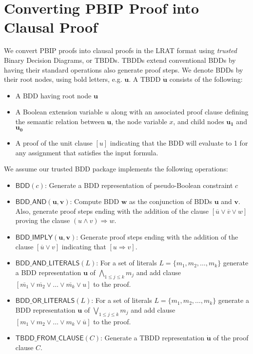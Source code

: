 \documentclass{fmcad}
\begin{document}
\section{Converting PBIP Proof into Clausal Proof }
We convert PBIP proofs into clausal proofs in the LRAT format using \textit{trusted} Binary
Decision Diagrams, or TBDDs. TBDDs extend conventional BDDs by having their standard operations
also generate proof steps. We denote BDDs by their root nodes, using bold letters, e.g.
$\mathbf{u}$. A TBDD $\dot{\mathbf{u}}$ consists of the following:

\begin{itemize}
\item A BDD having root node $\mathbf{u}$
\item A Boolean extension variable $u$ along with an associated proof clause defining the semantic
  relation between $\mathbf{u}$, the node variable $x$, and child nodes $\mathbf{u_1}$ and
  $\mathbf{u_0}$
\item A proof of the unit clause $[u]$ indicating that the BDD will evaluate to 1 for any
  assignment that satisfies the input formula.
\end{itemize}

We assume our trusted BDD package implements the following operations:

\begin{itemize}
\item $\mathsf{BDD}(c)$: Generate a BDD representation of pseudo-Boolean constraint $c$
\item $\mathsf{BDD\_AND}(\mathbf{u}, \mathbf{v})$: Compute BDD $\mathbf{w}$ as the conjunction
  of BDDs $\mathbf{u}$ and $\mathbf{v}$. Also, generate proof steps ending with the addition
  of the clause $[\overline{u} \lor \overline{v} \lor w]$ proving the clause
  $(u \land v) \Rightarrow w$.
\item $\mathsf{BDD\_IMPLY}(\mathbf{u}, \mathbf{v})$: Generate proof steps ending with the addition
  of the clause $[\overline{u} \lor v]$ indicating that $[u \Rightarrow v]$.
\item $\mathsf{BDD\_AND\_LITERALS}(L)$: For a set of literals $L = \{m_1, m_2, \dots, m_k\}$
  generate a BDD representation $\mathbf{u}$ of $\bigwedge_{1 \leq j \leq k} m_j$ and add clause
  $[\overline{m_1} \lor \overline{m_2} \lor \dots \lor \overline{m_k} \lor u]$ to the proof.
\item $\mathsf{BDD\_OR\_LITERALS}(L)$: For a set of literals $L = \{m_1, m_2, \dots, m_k\}$ generate
  a BDD representation $\mathbf{u}$ of $\bigvee_{1 \leq j \leq k} m_j$ and add clause
  $[m_1 \lor m_2 \lor \dots \lor m_k \lor \overline{u}]$ to the proof.
\item $\mathsf{TBDD\_FROM\_CLAUSE}(C)$: Generate a TBDD representation $\mathbf{\dot{u}}$ of the
  proof clause $C$.
\end{itemize}
\end{document}
